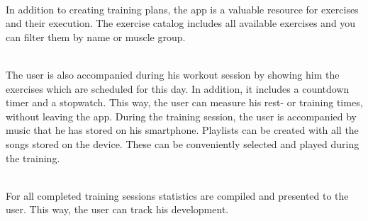 \documentclass[FIPLY_base.tex]{subfiles}
\begin{document}
\ \\
In addition to creating training plans, the app is a valuable resource for exercises and their execution.
The exercise catalog includes all available exercises and you can filter them by name or muscle group.

\ \\
The user is also accompanied during his workout session by showing him the exercises which are scheduled for this day. In addition, it includes a countdown timer and a stopwatch. This way, the user can measure his rest- or training times, without leaving the app.
During the training session, the user is accompanied by music that he has stored on his smartphone.
Playlists can be created with all the songs stored on the device. These can be conveniently selected and played during the training.

\ \\
For all completed training sessions statistics are compiled and presented to the user.
This way, the user can track his development.
\end{document}
